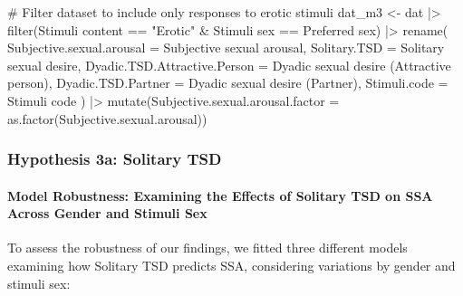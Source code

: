 \documentclass[
  bookmarksnumbered]{article}
\newenvironment{Shaded}{\begin{snugshade}}{\end{snugshade}}
\newcommand{\AttributeTok}[1]{\textcolor[rgb]{0.80,0.80,0.80}{#1}}
\newcommand{\CommentTok}[1]{\textcolor[rgb]{0.50,0.62,0.50}{#1}}
\newcommand{\FunctionTok}[1]{\textcolor[rgb]{0.94,0.94,0.56}{#1}}
\newcommand{\NormalTok}[1]{\textcolor[rgb]{0.80,0.80,0.80}{#1}}
\newcommand{\OtherTok}[1]{\textcolor[rgb]{0.94,0.94,0.56}{#1}}
\newcommand{\SpecialCharTok}[1]{\textcolor[rgb]{0.86,0.64,0.64}{#1}}
\newcommand{\StringTok}[1]{\textcolor[rgb]{0.80,0.58,0.58}{#1}}
\begin{document}
\begin{Shaded}
\begin{Highlighting}[]
\CommentTok{\# Filter dataset to include only responses to erotic stimuli}
\NormalTok{dat\_m3 }\OtherTok{\textless{}{-}}\NormalTok{ dat }\SpecialCharTok{|\textgreater{}}
  \FunctionTok{filter}\NormalTok{(}\StringTok{\textasciigrave{}}\AttributeTok{Stimuli content}\StringTok{\textasciigrave{}} \SpecialCharTok{==} \StringTok{"Erotic"} \SpecialCharTok{\&}
    \StringTok{\textasciigrave{}}\AttributeTok{Stimuli sex}\StringTok{\textasciigrave{}} \SpecialCharTok{==} \StringTok{\textasciigrave{}}\AttributeTok{Preferred sex}\StringTok{\textasciigrave{}}\NormalTok{) }\SpecialCharTok{|\textgreater{}}
  \FunctionTok{rename}\NormalTok{(}
    \AttributeTok{Subjective.sexual.arousal =} \StringTok{\textasciigrave{}}\AttributeTok{Subjective sexual arousal}\StringTok{\textasciigrave{}}\NormalTok{,}
    \AttributeTok{Solitary.TSD =} \StringTok{\textasciigrave{}}\AttributeTok{Solitary sexual desire}\StringTok{\textasciigrave{}}\NormalTok{,}
    \AttributeTok{Dyadic.TSD.Attractive.Person =} \StringTok{\textasciigrave{}}\AttributeTok{Dyadic sexual desire (Attractive person)}\StringTok{\textasciigrave{}}\NormalTok{,}
    \AttributeTok{Dyadic.TSD.Partner =} \StringTok{\textasciigrave{}}\AttributeTok{Dyadic sexual desire (Partner)}\StringTok{\textasciigrave{}}\NormalTok{,}
    \AttributeTok{Stimuli.code =} \StringTok{\textasciigrave{}}\AttributeTok{Stimuli code}\StringTok{\textasciigrave{}}
\NormalTok{  ) }\SpecialCharTok{|\textgreater{}}
  \FunctionTok{mutate}\NormalTok{(}\AttributeTok{Subjective.sexual.arousal.factor =} \FunctionTok{as.factor}\NormalTok{(Subjective.sexual.arousal))}
\end{Highlighting}
\end{Shaded}

\subsubsection{Hypothesis 3a: Solitary TSD}\label{hyp3a}

\paragraph{Model Robustness: Examining the Effects of Solitary TSD on SSA Across Gender and Stimuli Sex}\label{model-robustness-examining-the-effects-of-solitary-tsd-on-ssa-across-gender-and-stimuli-sex-1}

To assess the robustness of our findings, we fitted three different models examining how Solitary TSD predicts SSA, considering variations by gender and stimuli sex:
\end{document}
